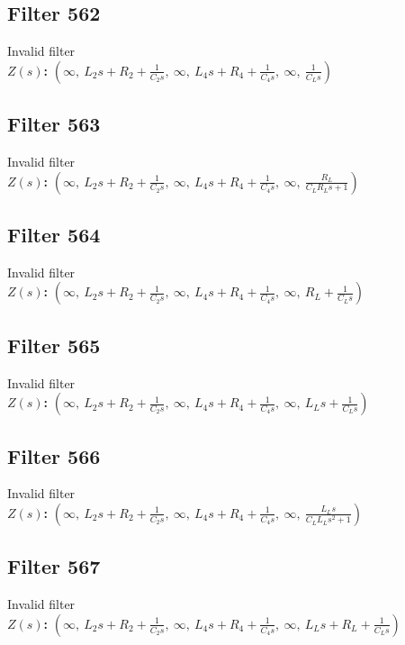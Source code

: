 \documentclass{article}
\begin{document}
\subsection*{Filter 562}
Invalid filter \\ 
\textbf{$Z(s)$:} $\left( \infty, \  L_{2} s + R_{2} + \frac{1}{C_{2} s}, \  \infty, \  L_{4} s + R_{4} + \frac{1}{C_{4} s}, \  \infty, \  \frac{1}{C_{L} s}\right)$ \\ 
\subsection*{Filter 563}
Invalid filter \\ 
\textbf{$Z(s)$:} $\left( \infty, \  L_{2} s + R_{2} + \frac{1}{C_{2} s}, \  \infty, \  L_{4} s + R_{4} + \frac{1}{C_{4} s}, \  \infty, \  \frac{R_{L}}{C_{L} R_{L} s + 1}\right)$ \\ 
\subsection*{Filter 564}
Invalid filter \\ 
\textbf{$Z(s)$:} $\left( \infty, \  L_{2} s + R_{2} + \frac{1}{C_{2} s}, \  \infty, \  L_{4} s + R_{4} + \frac{1}{C_{4} s}, \  \infty, \  R_{L} + \frac{1}{C_{L} s}\right)$ \\ 
\subsection*{Filter 565}
Invalid filter \\ 
\textbf{$Z(s)$:} $\left( \infty, \  L_{2} s + R_{2} + \frac{1}{C_{2} s}, \  \infty, \  L_{4} s + R_{4} + \frac{1}{C_{4} s}, \  \infty, \  L_{L} s + \frac{1}{C_{L} s}\right)$ \\ 
\subsection*{Filter 566}
Invalid filter \\ 
\textbf{$Z(s)$:} $\left( \infty, \  L_{2} s + R_{2} + \frac{1}{C_{2} s}, \  \infty, \  L_{4} s + R_{4} + \frac{1}{C_{4} s}, \  \infty, \  \frac{L_{L} s}{C_{L} L_{L} s^{2} + 1}\right)$ \\ 
\subsection*{Filter 567}
Invalid filter \\ 
\textbf{$Z(s)$:} $\left( \infty, \  L_{2} s + R_{2} + \frac{1}{C_{2} s}, \  \infty, \  L_{4} s + R_{4} + \frac{1}{C_{4} s}, \  \infty, \  L_{L} s + R_{L} + \frac{1}{C_{L} s}\right)$ \\ 
\end{document}
